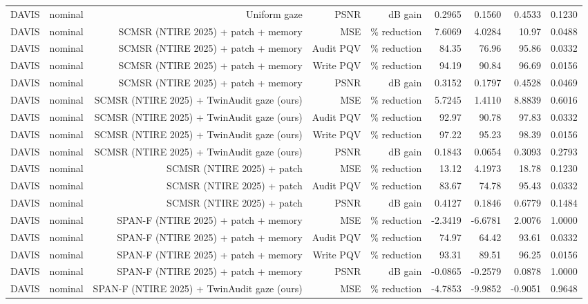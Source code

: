 \begin{table}[t]
\begin{tabular}{llrrrrrrr}
DAVIS & nominal & Uniform gaze & PSNR & dB gain & 0.2965 & 0.1560 & 0.4533 & 0.1230 \\
DAVIS & nominal & SCMSR (NTIRE 2025) + patch + memory & MSE & \% reduction & 7.6069 & 4.0284 & 10.97 & 0.0488 \\
DAVIS & nominal & SCMSR (NTIRE 2025) + patch + memory & Audit PQV & \% reduction & 84.35 & 76.96 & 95.86 & 0.0332 \\
DAVIS & nominal & SCMSR (NTIRE 2025) + patch + memory & Write PQV & \% reduction & 94.19 & 90.84 & 96.69 & 0.0156 \\
DAVIS & nominal & SCMSR (NTIRE 2025) + patch + memory & PSNR & dB gain & 0.3152 & 0.1797 & 0.4528 & 0.0469 \\
DAVIS & nominal & SCMSR (NTIRE 2025) + TwinAudit gaze (ours) & MSE & \% reduction & 5.7245 & 1.4110 & 8.8839 & 0.6016 \\
DAVIS & nominal & SCMSR (NTIRE 2025) + TwinAudit gaze (ours) & Audit PQV & \% reduction & 92.97 & 90.78 & 97.83 & 0.0332 \\
DAVIS & nominal & SCMSR (NTIRE 2025) + TwinAudit gaze (ours) & Write PQV & \% reduction & 97.22 & 95.23 & 98.39 & 0.0156 \\
DAVIS & nominal & SCMSR (NTIRE 2025) + TwinAudit gaze (ours) & PSNR & dB gain & 0.1843 & 0.0654 & 0.3093 & 0.2793 \\
DAVIS & nominal & SCMSR (NTIRE 2025) + patch & MSE & \% reduction & 13.12 & 4.1973 & 18.78 & 0.1230 \\
DAVIS & nominal & SCMSR (NTIRE 2025) + patch & Audit PQV & \% reduction & 83.67 & 74.78 & 95.43 & 0.0332 \\
DAVIS & nominal & SCMSR (NTIRE 2025) + patch & PSNR & dB gain & 0.4127 & 0.1846 & 0.6779 & 0.1484 \\
DAVIS & nominal & SPAN-F (NTIRE 2025) + patch + memory & MSE & \% reduction & -2.3419 & -6.6781 & 2.0076 & 1.0000 \\
DAVIS & nominal & SPAN-F (NTIRE 2025) + patch + memory & Audit PQV & \% reduction & 74.97 & 64.42 & 93.61 & 0.0332 \\
DAVIS & nominal & SPAN-F (NTIRE 2025) + patch + memory & Write PQV & \% reduction & 93.31 & 89.51 & 96.25 & 0.0156 \\
DAVIS & nominal & SPAN-F (NTIRE 2025) + patch + memory & PSNR & dB gain & -0.0865 & -0.2579 & 0.0878 & 1.0000 \\
DAVIS & nominal & SPAN-F (NTIRE 2025) + TwinAudit gaze (ours) & MSE & \% reduction & -4.7853 & -9.9852 & -0.9051 & 0.9648 \\

\end{tabular}
\end{table}
